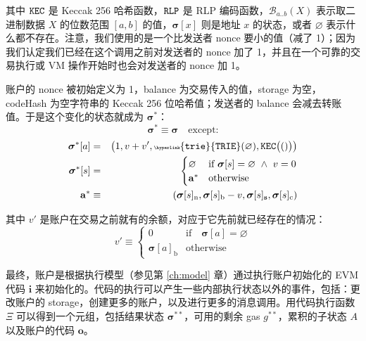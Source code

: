 \documentclass[9pt,oneside]{amsart}
\begin{document}
\begin{multicols}{2}
其中 $\mathtt{\tiny KEC}$ 是 Keccak 256 哈希函数，$\mathtt{\tiny RLP}$ 是 RLP 编码函数，$\mathcal{B}_{a..b}(X)$ 表示取二进制数据 $X$ 的位数范围 $[a, b]$ 的值，$\boldsymbol{\sigma}[x]$ 则是地址 $x$ 的状态，或者 $\varnothing$ 表示什么都不存在。注意，我们使用的是一个比发送者 nonce 要小的值（减了 1）；因为我们认定我们已经在这个调用之前对发送者的 nonce 加了 1，并且在一个可靠的交易执行或 VM 操作开始时也会对发送者的 nonce 加 1。

账户的 nonce 被初始定义为 1，balance 为交易传入的值，storage 为空，codeHash 为空字符串的 Keccak 256 位哈希值；发送者的 balance 会减去转账值。于是这个变化的状态就成为 $\boldsymbol{\sigma}^*$：
\begin{equation}
\boldsymbol{\sigma}^* \equiv \boldsymbol{\sigma} \quad \text{except:}
\end{equation}
\begin{eqnarray}
\boldsymbol{\sigma}^*[a] &=& \big( 1, v + v', \mathtt{\tiny \hyperlink{trie}{TRIE}}(\varnothing), \mathtt{\tiny KEC}\big(()\big) \big) \\
\boldsymbol{\sigma}^*[s] &=& \begin{cases}
\varnothing & \text{if}\ \boldsymbol{\sigma}[s] = \varnothing \ \wedge\ v = 0 \\
\mathbf{a}^* & \text{otherwise}
\end{cases} \\
\mathbf{a}^* &\equiv& (\boldsymbol{\sigma}[s]_{\mathrm{n}}, \boldsymbol{\sigma}[s]_{\mathrm{b}} - v, \boldsymbol{\sigma}[s]_{\mathbf{s}}, \boldsymbol{\sigma}[s]_{\mathrm{c}})
\end{eqnarray}

其中 $v'$ 是账户在交易之前就有的余额，对应于它先前就已经存在的情况：
\begin{equation}
v' \equiv \begin{cases}
0 & \text{if} \quad \boldsymbol{\sigma}[a] = \varnothing\\
\boldsymbol{\sigma}[a]_{\mathrm{b}} & \text{otherwise}
\end{cases}
\end{equation}


最终，账户是根据执行模型（参见第 \ref{ch:model} 章）通过执行账户初始化的 EVM 代码 $\mathbf{i}$ 来初始化的。代码的执行可以产生一些内部执行状态以外的事件，包括：更改账户的 storage，创建更多的账户，以及进行更多的消息调用。用代码执行函数 $\Xi$ 可以得到一个元组，包括结果状态 $\boldsymbol{\sigma}^{**}$，可用的剩余 gas $g^{**}$，累积的子状态 $A$ 以及账户的代码 $\mathbf{o}$。


\end{multicols}
\end{document}
